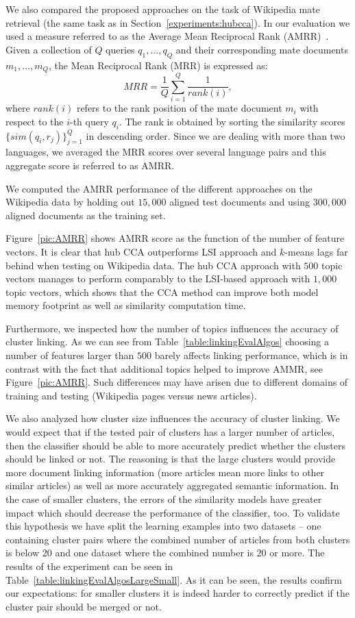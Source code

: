 We also compared the proposed approaches on the task of Wikipedia mate retrieval (the same task as in Section~\ref{experiments:hubcca}).
In our evaluation we used a measure referred to as
the Average Mean Reciprocal Rank (AMRR)~\cite{voorhees1999trec}. Given a collection of $Q$ queries $q_1,\ldots,q_Q$ and
their corresponding mate documents $m_1,\ldots,m_Q$, the Mean Reciprocal Rank (MRR) is expressed as:
$$ MRR = \frac{1}{Q}\sum_{i=1}^Q \frac{1}{rank(i)},$$
where $rank(i)$ refers to the rank position of the mate document $m_i$ with respect to the $i$-th query $q_i$.
The rank is obtained by sorting the similarity scores $\lbrace sim(q_i,r_j)\rbrace_{j=1}^Q$ in descending order.
Since we are dealing with more than two languages, we averaged the MRR scores over several language pairs and
this aggregate score is referred to as AMRR.

We computed the AMRR performance of the different approaches on the Wikipedia data by holding out $15,000$
aligned test documents and using $300,000$ aligned documents as the training set.

Figure~\ref{pic:AMRR} shows AMRR score as the function of the number of feature vectors.
It is clear that hub CCA outperforms LSI approach and $k$-means lags far behind when testing on Wikipedia data.
The hub CCA approach with $500$ topic vectors manages to perform comparably
to the LSI-based approach with $1,000$ topic vectors, which shows that the CCA
method can improve both model memory footprint as well as similarity computation time.

Furthermore, we inspected how the number of topics influences the accuracy of cluster linking.
As we can see from Table~\ref{table:linkingEvalAlgos} choosing a number of features larger
than $500$ barely affects linking performance, which is in contrast with the fact that additional
topics helped to improve AMMR, see Figure~\ref{pic:AMRR}. Such differences may have arisen
due to different domains of training and testing (Wikipedia pages versus news articles).

We also analyzed how cluster size influences the accuracy of cluster linking. We would
expect that if the tested pair of clusters has a larger number of articles, then the
classifier should be able to more accurately predict whether the clusters should be linked
or not. The reasoning is that the large clusters would provide more document linking information
(more articles mean more links to other similar articles) as well as more accurately aggregated
semantic information. In the case of smaller clusters, the errors of the similarity models have
greater impact which should decrease the performance of the classifier, too. To validate this
hypothesis we have split the learning examples into two datasets -- one containing cluster
pairs where the combined number of articles from both clusters is below 20 and one dataset
where the combined number is 20 or more. The results of the experiment can be seen in
Table~\ref{table:linkingEvalAlgosLargeSmall}. As it can be seen, the results confirm our
expectations: for smaller clusters it is indeed harder to correctly predict if the cluster
pair should be merged or not.

